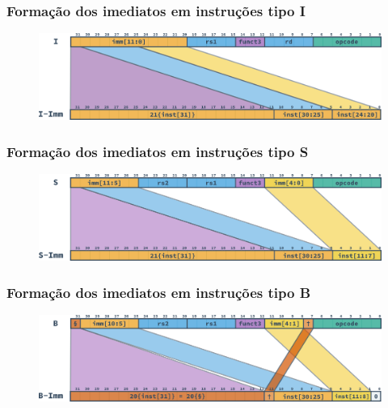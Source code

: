 \documentclass[aspectratio=169]{beamer}
\begin{document}
    \begin{frame}
        \frametitle{Formação dos imediatos em instruções tipo \textbf{I}}
        \vfill
        \begin{figure}[H]
        \centering
            \includegraphics[width=.9\textwidth,height=.9\textheight,keepaspectratio]
            {../images/instructions/rv32_i_immediate.png}
        \end{figure}
        \vfill
    \end{frame}

    \begin{frame}
        \frametitle{Formação dos imediatos em instruções tipo \textbf{S}}
        \vfill
        \begin{figure}[H]
        \centering
            \includegraphics[width=.9\textwidth,height=.9\textheight,keepaspectratio]
            {../images/instructions/rv32_s_immediate.png}
        \end{figure}
        \vfill
    \end{frame}

    \begin{frame}
        \frametitle{Formação dos imediatos em instruções tipo \textbf{B}}
        \vfill
        \begin{figure}[H]
        \centering
            \includegraphics[width=.9\textwidth,height=.9\textheight,keepaspectratio]
            {../images/instructions/rv32_b_immediate.png}
        \end{figure}
        \vfill
    \end{frame}
\end{document}
